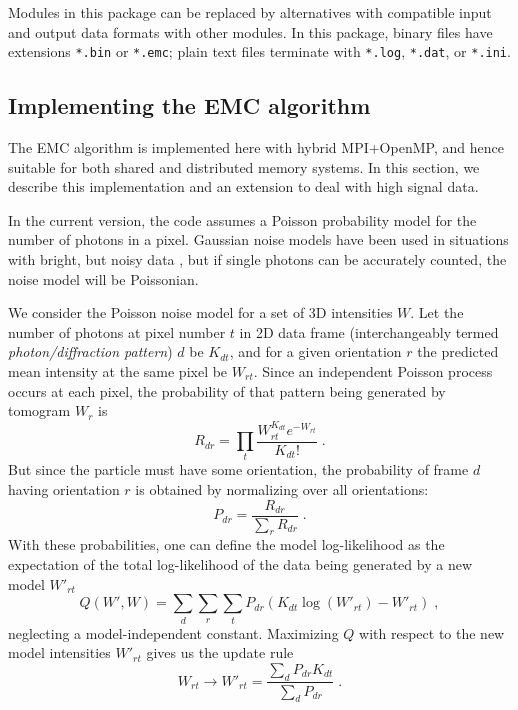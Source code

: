 \documentclass[]{iucr}              %
\begin{document}
Modules in this package can be replaced by alternatives with compatible input and output data formats with other modules. In this package, binary files have extensions \texttt{*.bin} or \texttt{*.emc}; plain text files terminate with \texttt{*.log}, \texttt{*.dat}, or \texttt{*.ini}.

\subsection{Implementing the EMC algorithm}\label{subsec:EMC}
The EMC algorithm \cite{loh2009} is implemented here with hybrid MPI+OpenMP, and hence suitable for both shared and distributed memory systems. In this section, we describe this implementation and an extension to deal with high signal data. 

In the current version, the code assumes a Poisson probability model for the number of photons in a pixel. 
Gaussian noise models have been used in situations with bright, but noisy data \cite{loh2010,ekeberg2015}, but if single photons can be accurately counted, the noise model will be Poissonian. 

We consider the Poisson noise model for a set of 3D intensities $W$. Let the number of photons at pixel number $t$ in 2D data frame (interchangeably termed {\it photon/diffraction pattern}) $d$ be $K_{dt}$, and for a given orientation $r$ the predicted mean intensity at the same pixel be $W_{rt}$. Since an independent Poisson process occurs at each pixel, the probability of that pattern being generated by tomogram $W_r$ is
\begin{equation}
R_{dr} = \prod_t \frac{W_{rt}^{K_{dt}} e^{-W_{rt}}}{K_{dt}!} \;.
\label{eqn:probnumr}
\end{equation}
But since the particle must have some orientation, the probability of frame $d$ having orientation $r$ is obtained by normalizing over all orientations:
\begin{equation}
P_{dr} = \frac{R_{dr}}{\sum\limits_r R_{dr}}\;.
\label{eqn:prob}
\end{equation}
With these probabilities, one can define the model log-likelihood as the expectation of the total log-likelihood of the data being generated by a new model $W'_{rt}$
\begin{equation}
Q(W', W) = \sum_d \sum_r \sum_t P_{dr} (K_{dt} \log(W'_{rt}) - W'_{rt}) \;, 
\label{eqn:totalq}
\end{equation}
neglecting a model-independent constant. Maximizing $Q$ with respect to the new model intensities $W'_{rt}$ gives us the update rule
\begin{equation}
W_{rt} \longrightarrow W'_{rt} = \frac{\sum\limits_d P_{dr} K_{dt}}{\sum\limits_d P_{dr}}\;.
\label{eqn:wupdate}
\end{equation}
\end{document}
